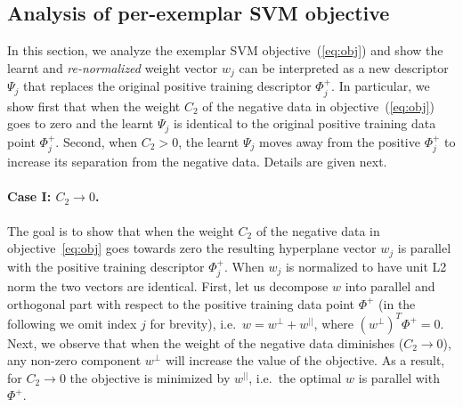 \documentclass[table]{article} %
\begin{document}
	\subsection*{Analysis of per-exemplar SVM objective} \vspace{-0.2cm} 

In this section, we analyze the exemplar SVM objective~(\ref{eq:obj}) and show the learnt and {\em re-normalized} weight vector $w_j$ can be interpreted as 
a new descriptor $\Psi_j$ that replaces the original positive training descriptor $\Phi^+_j$.  In particular, we show first that when the weight $C_2$ of the negative data in objective~(\ref{eq:obj}) goes to zero and the learnt $\Psi_j$ is identical to the original positive training data point $\Phi_j^+$.  Second, when $C_2>0$, the learnt $\Psi_j$ moves away from the positive $\Phi_j^+$ to increase its separation from the negative data. %
Details are given next.



\paragraph{Case I: $C_2\rightarrow 0$.}
The goal is to show that when the weight  $C_2$ of the negative data in objective~\eqref{eq:obj} goes towards zero the resulting hyperplane vector $w_j$ is parallel with the positive training descriptor $\Phi_j^+$. When $w_j$ is normalized to have unit L2 norm the two vectors are identical.
		First, let us decompose $w$ into parallel and orthogonal part with respect to the positive training data point $\Phi^+$ (in the following we omit index $j$ for brevity), i.e.\
$w=w^{\perp}+w^{||}$, where $(w^{\perp})^T \Phi^+ = 0$. Next, we observe that when the weight of the negative data diminishes ($C_2\rightarrow 0$), any non-zero component $w^{\perp}$ will increase the value of the objective. As a result, for $C_2\rightarrow 0$ the objective is minimized by $w^{||}$, i.e.\ the optimal $w$ is parallel with $\Phi^+$. %
 
\end{document}
